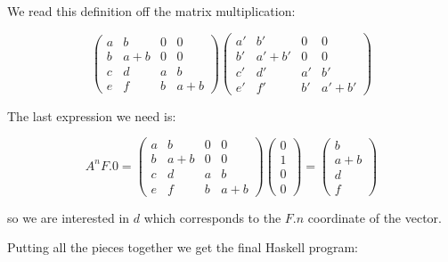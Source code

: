 We read this definition off the matrix multiplication:

\begin{equation*}
\begin{pmatrix}
       a & b & 0 & 0\\
       b & a + b & 0 & 0\\
       c & d & a & b\\
       e & f & b & a + b
       \end{pmatrix}
  \begin{pmatrix}
       a' & b' & 0 & 0\\
       b' & a' + b' & 0 & 0\\
       c' & d' & a' & b'\\
       e' & f' & b' & a' + b'
       \end{pmatrix}     
\end{equation*}

The last expression we need is:

\begin{equation*}
A^n F.0 = \begin{pmatrix}
       a & b & 0 & 0\\
       b & a + b & 0 & 0\\
       c & d & a & b\\
       e & f & b & a + b
       \end{pmatrix} 
 \begin{pmatrix}
       0\\
       1\\
       0\\
       0
       \end{pmatrix}   = 
    \begin{pmatrix}
       b\\
       a + b\\
       d\\
        f
       \end{pmatrix}    
\end{equation*} 

so we are interested in $d$ which corresponds to the $F.n$ coordinate of the vector.      

Putting all the pieces together we get the final Haskell program:

\newpage


